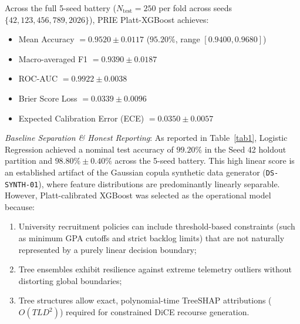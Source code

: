 \documentclass[conference]{IEEEtran}
\begin{document}
\begin{table}[htbp]
\caption{Placement Readiness Benchmark \& Calibration Performance (Test Partition, Seed 42, $N=500$)}
\begin{center}
\label{tab1}
\end{center}
\end{table}

Across the full 5-seed battery ($N_{\text{test}} = 250$ per fold across seeds $\{42, 123, 456, 789, 2026\}$), PRIE Platt-XGBoost achieves:
\begin{itemize}
\item Mean Accuracy $= 0.9520 \pm 0.0117$ ($95.20\%$, range $[0.9400, 0.9680]$)
\item Macro-averaged F1 $= 0.9390 \pm 0.0187$
\item ROC-AUC $= 0.9922 \pm 0.0038$
\item Brier Score Loss $= 0.0339 \pm 0.0096$
\item Expected Calibration Error (ECE) $= 0.0350 \pm 0.0057$
\end{itemize}

\textit{Baseline Separation \& Honest Reporting}: As reported in Table~\ref{tab1}, Logistic Regression achieved a nominal test accuracy of $99.20\%$ in the Seed 42 holdout partition and $98.80\% \pm 0.40\%$ across the 5-seed battery. This high linear score is an established artifact of the Gaussian copula synthetic data generator (\texttt{DS-SYNTH-01}), where feature distributions are predominantly linearly separable. However, Platt-calibrated XGBoost was selected as the operational model because:
\begin{enumerate}
\item University recruitment policies can include threshold-based constraints (such as minimum GPA cutoffs and strict backlog limits) that are not naturally represented by a purely linear decision boundary;
\item Tree ensembles exhibit resilience against extreme telemetry outliers without distorting global boundaries;
\item Tree structures allow exact, polynomial-time TreeSHAP attributions ($O(TLD^2)$) required for constrained DiCE recourse generation.
\end{enumerate}
\end{document}
